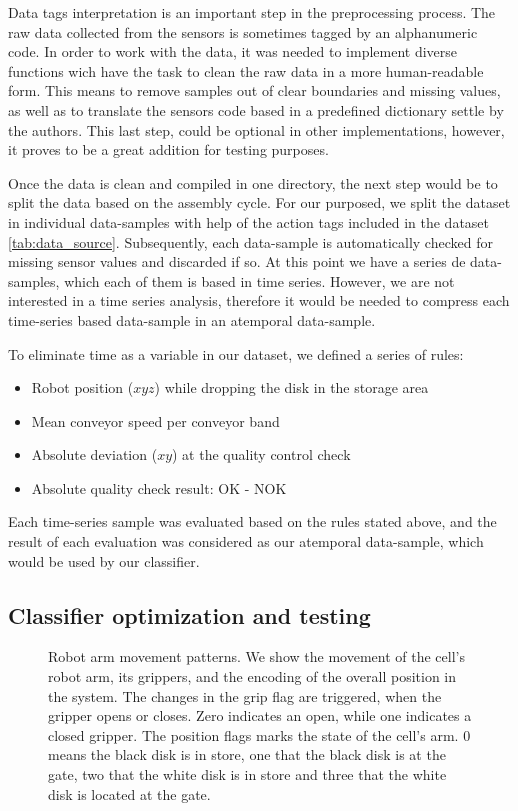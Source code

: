 \documentclass[5p,times,procedia]{elsarticle}
\begin{document}
Data tags interpretation is an important step in the preprocessing process. The raw data collected from the sensors is sometimes tagged by an alphanumeric code. In order to work with the data, it was needed to implement diverse functions wich have the task to clean the raw data in a more human-readable form. This means to remove samples out of clear boundaries and missing values, as well as to translate the sensors code based in a predefined dictionary settle by the authors. This last step, could be optional in other implementations, however, it proves to be a great addition for testing purposes.

Once the data is clean and compiled in one directory, the next step would be to split the data based on the assembly cycle. For our purposed, we split the dataset in individual data-samples with help of the action tags included in the dataset \ref{tab:data_source}. Subsequently, each data-sample is automatically checked for missing sensor values and discarded if so. At this point we have a series de data-samples, which each of them is based in time series. However, we are not interested in a time series analysis, therefore it would be needed to compress each time-series based data-sample in an atemporal data-sample.

To eliminate time as a variable in our dataset, we defined a series of rules:

\begin{itemize}
       \item Robot position ($xyz$) while dropping the disk in the storage area
       \item Mean conveyor speed per conveyor band
       \item Absolute deviation ($xy$) at the quality control check
       \item Absolute quality check result: OK - NOK
\end{itemize}

Each time-series sample was evaluated based on the rules stated above, and the result of each evaluation was considered as our atemporal data-sample, which would be used by our classifier.

\subsection{Classifier optimization and testing}\label{sec:ml_exp}

\begin{figure}
       
       \caption{Robot arm movement patterns. We show the movement of the 
                cell's robot arm, its grippers, and the encoding of the overall
                position in the system. The changes in the grip flag are triggered,
                when the gripper opens or closes. Zero indicates an open, while
                one indicates a closed gripper. The position flags marks the state
                of the cell's arm. 0 means the black disk is in store,
                one that the black disk is at the gate, two that the white disk
                is in store and three that the white disk is located at the gate.
             }
\label{fig:robot_pos_cell}
\end{figure}
\end{document}
